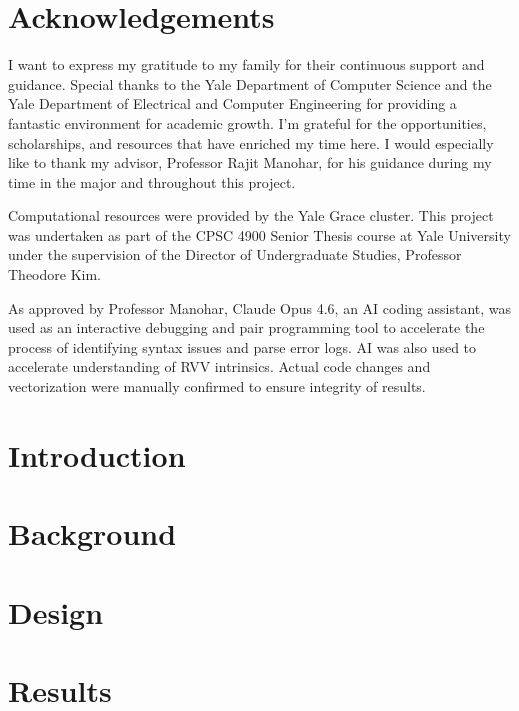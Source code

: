\documentclass[12pt,twoside]{report}
\begin{document}


\chapter*{Acknowledgements}
I want to express my gratitude to my family for their continuous support and guidance. Special thanks to the Yale Department of Computer Science and the Yale Department of Electrical and Computer Engineering for providing a fantastic environment for academic growth. I'm grateful for the opportunities, scholarships, and resources that have enriched my time here. I would especially like to thank my advisor, Professor Rajit Manohar, for his guidance during my time in the major and throughout this project. 

Computational
resources were provided by the Yale Grace cluster. This
project was undertaken as part of the CPSC 4900 Senior Thesis course at Yale University under the supervision of
the Director of Undergraduate Studies, Professor Theodore
Kim.

As approved by Professor Manohar, Claude Opus 4.6, an AI coding assistant, was used as an interactive
debugging and pair programming tool to accelerate the process of
identifying syntax issues and parse error logs. AI was also used to
accelerate understanding of RVV intrinsics. Actual code changes and
vectorization were manually confirmed to ensure integrity of results.

{
  \hypersetup{linkcolor=black}
  \tableofcontents
}

\clearpage




\chapter{Introduction}


\chapter{Background} \label{ch:background}


\chapter{Design} \label{ch:methodology}



\chapter{Results} \label{ch:results}

\end{document}
